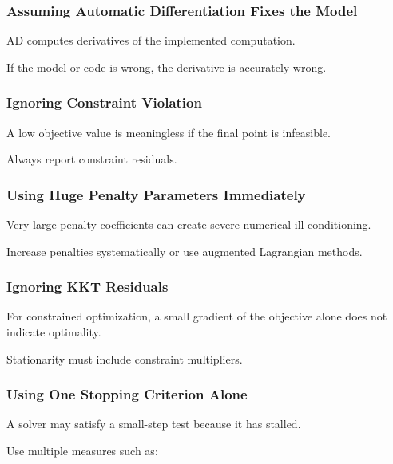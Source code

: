 \subsubsection{Assuming Automatic Differentiation Fixes the Model}

AD computes derivatives of the implemented computation.

If the model or code is wrong, the derivative is accurately wrong.

\subsubsection{Ignoring Constraint Violation}

A low objective value is meaningless if the final point is infeasible.

Always report constraint residuals.

\subsubsection{Using Huge Penalty Parameters Immediately}

Very large penalty coefficients can create severe numerical ill
conditioning.

Increase penalties systematically or use augmented Lagrangian methods.

\subsubsection{Ignoring KKT Residuals}

For constrained optimization, a small gradient of the objective alone does
not indicate optimality.

Stationarity must include constraint multipliers.

\subsubsection{Using One Stopping Criterion Alone}

A solver may satisfy a small-step test because it has stalled.

Use multiple measures such as:

